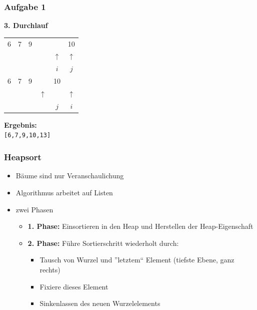 \documentclass{beamer}
\begin{document}
\begin{frame} \frametitle{Aufgabe 1}
	\centering
	\textbf{3. Durchlauf} \\[1em]
	
	\begin{tabular}{cc||cc||cc}
		6 & 7 & 9 & & \fbox{13} & 10 \\
		& & & & $\uparrow$ & $\uparrow$ \\
		& & & & $i$ & $j$ \\
		
		6 & 7 & 9 & & 10 & \fbox{13} \\
		& & & $\uparrow$ & & $\uparrow$ \\
		& & & & $j$ & $i$ \\
	\end{tabular}
	\vspace{1cm}
	
	\textbf{Ergebnis:} \\
	\texttt{[6,7,9,10,13]}
\end{frame}


\begin{frame} \frametitle{Heapsort}
	\begin{itemize}
		\item Bäume sind nur Veranschaulichung
		\item Algorithmus arbeitet auf Listen
		\item zwei Phasen
		\begin{itemize}
			\item \textbf{1. Phase:} Einsortieren in den Heap und Herstellen der Heap-Eigenschaft
			\item \textbf{2. Phase:} Führe Sortierschritt wiederholt durch:
			\begin{itemize}
				\item Tausch von Wurzel und ''letztem`` Element (tiefste Ebene, ganz rechts)
				\item Fixiere dieses Element
				\item Sinkenlassen des neuen Wurzelelements
			\end{itemize}
		\end{itemize}
	\end{itemize}
\end{frame}
\end{document}
